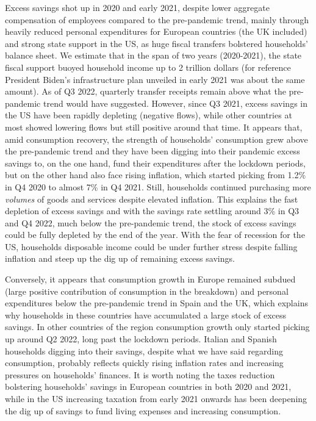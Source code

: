 Excess savings shot up in 2020 and early 2021, despite lower aggregate compensation of employees compared to the pre-pandemic trend, mainly through heavily reduced personal expenditures for European countries (the UK included) and strong state support in the US, as huge fiscal transfers bolstered households’ balance sheet. 
We estimate that in the span of two years (2020-2021), the state fiscal support buoyed household income up to 2 trillion dollars (for reference President Biden's infrastructure plan unveiled in early 2021 was about the same amount). 
As of Q3 2022, quarterly transfer receipts remain above what the pre-pandemic trend would have suggested. 
However, since Q3 2021, excess savings in the US have been rapidly depleting (negative flows), while other countries at most showed lowering flows but still positive around that time. 
It appears that, amid consumption recovery, the strength of households’ consumption grew above the pre-pandemic trend and they have been digging into their pandemic excess savings to, on the one hand, fund their expenditures after the lockdown periods, but on the other hand also face rising inflation, which started picking from 1.2\% in Q4 2020 to almost 7\% in Q4 2021. 
Still, households continued purchasing more \textit{volumes} of goods and services despite elevated inflation. 
This explains the fast depletion of excess savings and with the savings rate settling around 3\% in Q3 and Q4 2022, much below the pre-pandemic trend, the stock of excess savings could be fully depleted by the end of the year. 
With the fear of recession for the US, households disposable income could be under further stress despite falling inflation and steep up the dig up of remaining excess savings.

Conversely, it appears that consumption growth in Europe remained subdued (large positive contribution of consumption in the breakdown) and personal expenditures below the pre-pandemic trend in Spain and the UK, which explains why households in these countries have accumulated a large stock of excess savings. 
In other countries of the region consumption growth only started picking up around Q2 2022, long past the lockdown periods. Italian and Spanish households digging into their savings, despite what we have said regarding consumption, probably reflects quickly rising inflation rates and increasing pressures on households’ finances. 
It is worth noting the taxes reduction bolstering households’ savings in European countries in both 2020 and 2021, while in the US increasing taxation from early 2021 onwards has been deepening the dig up of savings to fund living expenses and increasing consumption.

